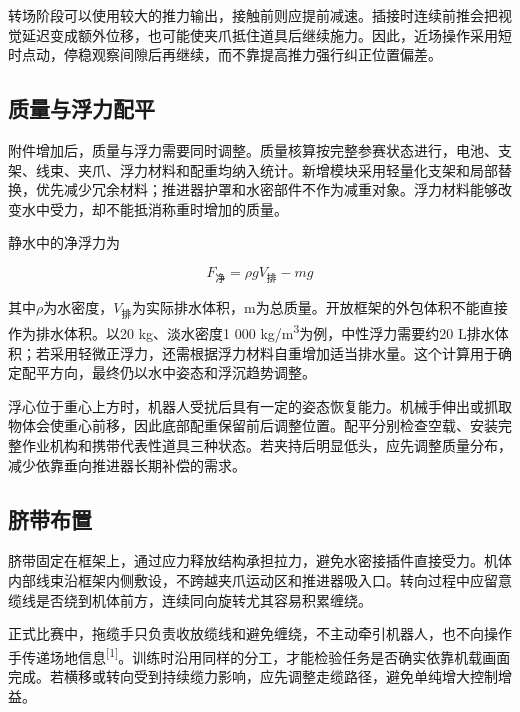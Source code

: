 转场阶段可以使用较大的推力输出，接触前则应提前减速。插接时连续前推会把视觉延迟变成额外位移，也可能使夹爪抵住道具后继续施力。因此，近场操作采用短时点动，停稳观察间隙后再继续，而不靠提高推力强行纠正位置偏差。\par

\subsection{质量与浮力配平}

附件增加后，质量与浮力需要同时调整。质量核算按完整参赛状态进行，电池、支架、线束、夹爪、浮力材料和配重均纳入统计。新增模块采用轻量化支架和局部替换，优先减少冗余材料；推进器护罩和水密部件不作为减重对象。浮力材料能够改变水中受力，却不能抵消称重时增加的质量。\par

静水中的净浮力为\par

\begin{equation}F_{\text{净}}=\rho gV_{\text{排}}-mg\end{equation}

其中\(\rho\)为水密度，\(V_{\text{排}}\)为实际排水体积，m为总质量。开放框架的外包体积不能直接作为排水体积。以20 kg、淡水密度1 000 kg/m\textsuperscript{3}为例，中性浮力需要约20 L排水体积；若采用轻微正浮力，还需根据浮力材料自重增加适当排水量。这个计算用于确定配平方向，最终仍以水中姿态和浮沉趋势调整。\par

浮心位于重心上方时，机器人受扰后具有一定的姿态恢复能力。机械手伸出或抓取物体会使重心前移，因此底部配重保留前后调整位置。配平分别检查空载、安装完整作业机构和携带代表性道具三种状态。若夹持后明显低头，应先调整质量分布，减少依靠垂向推进器长期补偿的需求。\par

\subsection{脐带布置}

脐带固定在框架上，通过应力释放结构承担拉力，避免水密接插件直接受力。机体内部线束沿框架内侧敷设，不跨越夹爪运动区和推进器吸入口。转向过程中应留意缆线是否绕到机体前方，连续同向旋转尤其容易积累缠绕。\par

正式比赛中，拖缆手只负责收放缆线和避免缠绕，不主动牵引机器人，也不向操作手传递场地信息\textsuperscript{[1]}。训练时沿用同样的分工，才能检验任务是否确实依靠机载画面完成。若横移或转向受到持续缆力影响，应先调整走缆路径，避免单纯增大控制增益。\par

